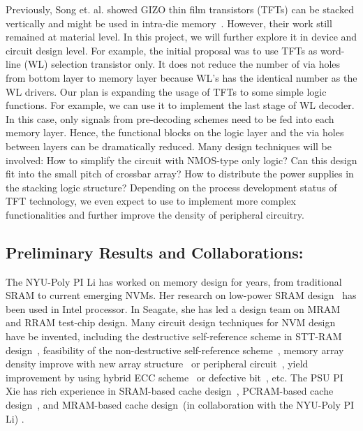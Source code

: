 Previously, Song et. al. showed GIZO thin film transistors (TFTs) can be stacked vertically and might be used in intra-die memory~\cite{Song08}. However, their work still remained at material level. In this project, we will further explore it in device and circuit design level. For example, the initial proposal was to use TFTs as word-line (WL) selection transistor only. It does not reduce the number of via holes from bottom layer to memory layer because WL's has the identical number as the WL drivers. Our plan is expanding the usage of TFTs to some simple logic functions. For example, we can use it to implement the last stage of WL decoder. In this case, only signals from pre-decoding schemes need to be fed into each memory layer. Hence, the functional blocks on the logic layer and the via holes between layers can be dramatically reduced. Many design techniques will be involved: How to simplify the circuit with NMOS-type only logic? Can this design fit into the small pitch of crossbar array? How to distribute the power supplies in the stacking logic structure? Depending on the process development status of TFT technology, we even expect to use to implement more complex functionalities and further improve the density of peripheral circuitry.

\subsection{Preliminary Results and Collaborations:}
The NYU-Poly PI Li has worked on memory design for years, from traditional SRAM to current emerging NVMs. Her research on low-power SRAM design ~\cite{Agarwal02,Agarwal03,Bhunia02}has been used in Intel processor. In Seagate, she has led a design team on MRAM and RRAM test-chip design. Many circuit design techniques for NVM design have be invented, including the destructive self-reference scheme in STT-RAM design~\cite{Li:147723}, feasibility of the non-destructive self-reference scheme~\cite{Chen:147727}, memory array density improve with new array structure~\cite{Li:242331,Chen:170549} or peripheral circuit~\cite{Li:250027,Li:426098}, yield improvement by using hybrid ECC scheme~\cite{Chen:198516} or defective bit~\cite{Li:502194}, etc.  The PSU PI Xie has rich experience in SRAM-based cache design~\cite{Xie:TC09,XIE:TVLSI2008-3DCacti,Xie:MTDT09,Xie:ISCA09,xie:iccd05-3d}, PCRAM-based cache design~\cite{xie:glsvisl08-pram}, and MRAM-based cache design~\cite{XIE:HPCA09,Xie:dac08}(in collaboration with the NYU-Poly PI Li) . 

 